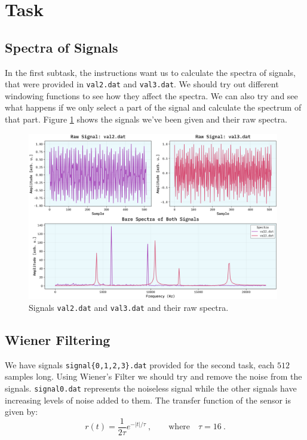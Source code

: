 \documentclass[10pt, titlepage, a4paper]{article}
\begin{document}
\section{Task}
\subsection{Spectra of Signals}
In the first subtask, the instructions want us to calculate the spectra of signals, that were provided in \texttt{val2.dat} and \texttt{val3.dat}. We should 
try out different windowing functions to see how they affect the spectra. We can also try and see what happens if we only select a part of the signal and
calculate the spectrum of that part. Figure \ref{fig:signals} shows the signals we've been given and their raw spectra.

\begin{figure}[h]
    \centering
    \includegraphics[width=0.98\textwidth]{../SpectralAnalysis/Images/raw-signals-spectra.png}
    \caption{Signals \texttt{val2.dat} and \texttt{val3.dat} and their raw spectra.}
    \label{fig:signals}
\end{figure}

\subsection{Wiener Filtering}
We have signals \texttt{signal\{0,1,2,3\}.dat} provided for the second task, each $512$ samples long.  Using Wiener's Filter we should try and 
remove the noise from the signals. \texttt{signal0.dat} represents the noiseless signal while the other signals have increasing levels of noise added to them.
The transfer function of the sensor is given by:
%
\begin{equation}
    r(t) = \frac{1}{2\tau} e^{-|t|/\tau}\>, \quad\quad\text{where}\quad\tau = 16\>.
\end{equation}
%
\end{document}
